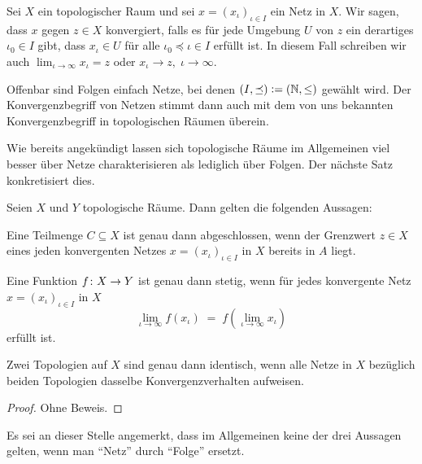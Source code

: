 \documentclass[../main/main.tex]{subfiles}
\begin{document}
	\begin{Definition}
		Sei $X$ ein topologischer Raum und sei $x = (x_\iota)_{\iota \in I}$ ein Netz in $X$. Wir sagen, dass $x$ gegen $z \in X$ konvergiert, falls
		es für jede Umgebung $U$ von $z$ ein derartiges $\iota_0 \in I$ gibt, dass $x_\iota \in U$ für alle $\iota_0 \preceq \iota \in I$ erfüllt ist.
		In diesem Fall schreiben wir auch $\lim_{\iota \to \infty} x_\iota = z$ oder $x_\iota \to z, \; \iota \to \infty$.
	\end{Definition}
	
	\begin{Bemerkung}
		Offenbar sind Folgen einfach Netze, bei denen $(I, \preceq) \vcentcolon = (\mathbb{N}, \leq)$ gewählt wird. Der Konvergenzbegriff von Netzen stimmt
		dann auch mit dem von uns bekannten Konvergenzbegriff in topologischen Räumen überein.
	\end{Bemerkung}
	
	Wie bereits angekündigt lassen sich topologische Räume im Allgemeinen viel besser über Netze charakterisieren als lediglich über Folgen. Der nächste Satz
	konkretisiert dies.
	
	\begin{Satz}
		\label{thm:netconvergence}
		Seien $X$ und $Y$ topologische Räume. Dann gelten die folgenden Aussagen:
		\begin{enumeratethm}
			\item Eine Teilmenge $C \subseteq X$ ist genau dann abgeschlossen, wenn der Grenzwert $z \in X$ eines jeden konvergenten Netzes 
			$x = (x_\iota)_{\iota \in I}$ in $X$ bereits in $A$ liegt.
			\item Eine Funktion $f \colon X \to Y$ ist genau dann stetig, wenn für jedes konvergente Netz $x = (x_\iota)_{\iota \in I}$ in $X$ 
			\[ \lim_{\iota \to \infty} f(x_\iota) \; = \; f(\lim_{\iota \to \infty} x_\iota) \]
			erfüllt ist.
			\item Zwei Topologien auf $X$ sind genau dann identisch, wenn alle Netze in $X$ bezüglich beiden Topologien dasselbe Konvergenzverhalten aufweisen.
		\end{enumeratethm}
	\end{Satz}
	
	\begin{proof}
		Ohne Beweis.
	\end{proof}
	
	\begin{Bemerkung}
		Es sei an dieser Stelle angemerkt, dass im Allgemeinen keine der drei Aussagen gelten, wenn man \enquote{Netz} durch \enquote{Folge} ersetzt.
	\end{Bemerkung}
	
\end{document}
